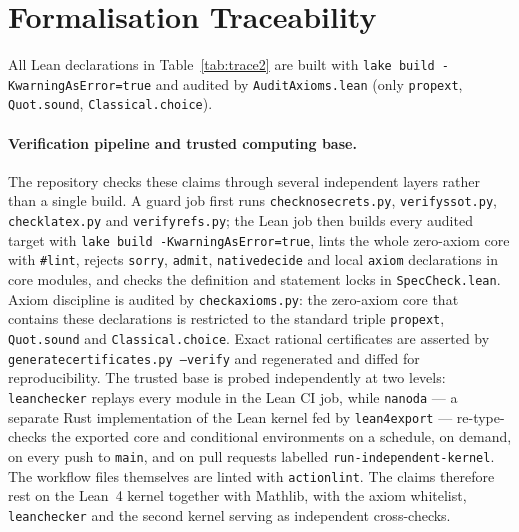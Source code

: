 \documentclass[11pt,a4paper]{article}
\theoremstyle{remark}
\renewcommand{\_}{\textunderscore\allowbreak}
\newcommand{\lean}[1]{\texttt{#1}}
\begin{document}
\section{Formalisation Traceability}

All Lean declarations in Table~\ref{tab:trace2} are built with \lean{lake build -KwarningAsError=true} and audited by \lean{AuditAxioms.lean} (only \lean{propext}, \lean{Quot.sound}, \lean{Classical.choice}).

\paragraph{Verification pipeline and trusted computing base.}
The repository checks these claims through several independent layers rather than a single build. A guard job first runs \lean{check\_no\_secrets.py}, \lean{verify\_ssot.py}, \lean{check\_latex.py} and \lean{verify\_refs.py}; the Lean job then builds every audited target with \lean{lake build -KwarningAsError=true}, lints the whole zero-axiom core with \lean{\#lint}, rejects \lean{sorry}, \lean{admit}, \lean{native\_decide} and local \lean{axiom} declarations in core modules, and checks the definition and statement locks in \lean{SpecCheck.lean}. Axiom discipline is audited by \lean{check\_axioms.py}: the zero-axiom core that contains these declarations is restricted to the standard triple \lean{propext}, \lean{Quot.sound} and \lean{Classical.choice}. Exact rational certificates are asserted by \lean{generate\_certificates.py --verify} and regenerated and diffed for reproducibility. The trusted base is probed independently at two levels: \lean{leanchecker} replays every module in the Lean CI job, while \lean{nanoda} --- a separate Rust implementation of the Lean kernel fed by \lean{lean4export} --- re-type-checks the exported core and conditional environments on a schedule, on demand, on every push to \lean{main}, and on pull requests labelled \lean{run-independent-kernel}. The workflow files themselves are linted with \lean{actionlint}. The claims therefore rest on the Lean~4 kernel together with Mathlib, with the axiom whitelist, \lean{leanchecker} and the second kernel serving as independent cross-checks.
\end{document}
